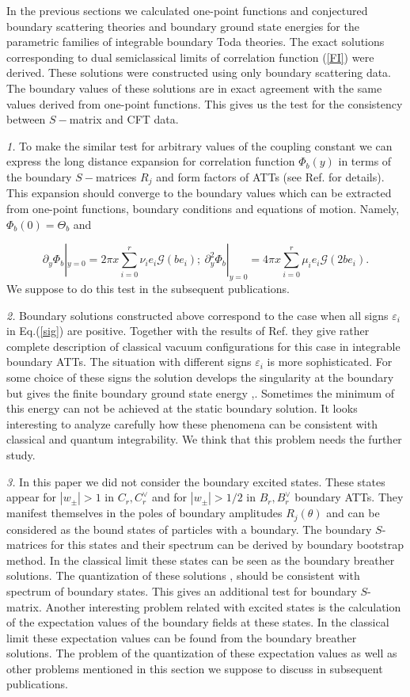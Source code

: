 \documentclass[a4paper,12pt,titlepage,final]{article}
\begin{document}
In the previous sections we calculated one-point functions and conjectured
boundary scattering theories and boundary ground state energies for the
parametric families of integrable boundary Toda theories. The exact
solutions corresponding to dual semiclassical limits of correlation function
(\ref{FI}) were derived. These solutions were constructed using only
boundary scattering data. The boundary values of these solutions are in
exact agreement with the same values derived from one-point functions. This
gives us the test for the consistency between $S-$matrix and CFT data.

\textit{1.\/} To make the similar test for arbitrary values of the coupling
constant we can express the long distance expansion for correlation
function
$\Phi _{b}(y)$ in terms of the boundary $S-$matrices $R_{j}$ and form
factors of ATTs (see Ref.\cite{DPW} for details). This expansion should
converge to the boundary values which can be extracted from one-point
functions, boundary conditions and equations of motion. Namely, $\Phi
_{b}(0)=\Theta _{b}$ and

\[
\partial _{y}\Phi _{b}|_{y=0}=2\pi x\sum_{i=0}^{r}\nu _{i}e_{i}\mathcal{G}
(be_{i});~\partial _{y}^{2}\Phi _{b}|_{y=0}=
4\pi x\sum_{i=0}^{r}\mu_{i}e_{i}
\mathcal{G}(2be_{i}).
\]
We suppose to do this test in the subsequent publications.

\textit{2.\/} Boundary solutions constructed above correspond to the case when
all signs $\varepsilon _{i}$ in Eq.(\ref{sig}) are positive. Together with
the results of Ref.\cite{FO} they give rather complete description of
classical vacuum configurations for this case in integrable boundary ATTs.
The situation with different signs $\varepsilon _{i}$ is more sophisticated.
For some choice of these signs the solution develops the singularity at the
boundary but gives the finite boundary ground state energy \cite{BOWC},\cite
{BPR}. Sometimes the minimum of this energy can not be achieved at the
static boundary solution. It looks interesting to analyze carefully how
these phenomena can be consistent with classical and quantum 
integrability. We
think that this problem needs the further study.

\textit{3.\/} In this paper we did not consider the boundary excited states. These
states appear for $|w_{\pm }|>1$ in $C_{r},C_{r}^{\vee }$ and for
$|w_{\pm}|>1/2$ in $B_{r},B_{r}^{\vee }$ boundary ATTs.
They manifest themselves in
the poles of boundary amplitudes $R_{j}(\theta )$ and can be considered as
the bound states of particles with a boundary. The boundary $S$-matrices
for this states and their spectrum can be derived by boundary bootstrap
method. In the classical limit these states can be seen as the boundary
breather solutions. The quantization of these solutions \cite{CT},\cite{CDE}
should be consistent with spectrum of boundary states. This gives an
additional test for boundary $S$-matrix. Another interesting problem related
with excited states is the calculation of the expectation values of the
boundary fields at these states. In the classical limit these expectation
values can be found from the boundary breather solutions. The problem of the
quantization of these expectation values as well as other problems mentioned
in this section we suppose to discuss in subsequent publications.
\end{document}
